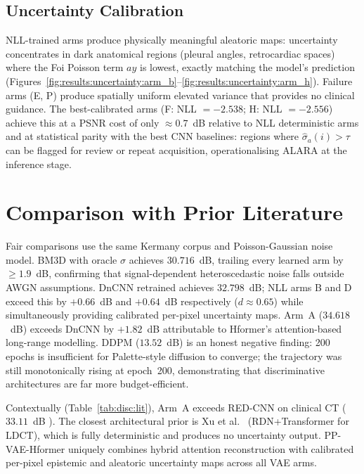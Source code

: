 \documentclass[12pt, a4paper, twoside, openright]{book}
\begin{document}
\subsection{Uncertainty Calibration}
\label{sec:disc:findings:calibration}

NLL-trained arms produce physically meaningful aleatoric maps: uncertainty concentrates in dark anatomical regions (pleural angles, retrocardiac spaces) where the Foi Poisson term $ay$ is lowest, exactly matching the model's prediction (Figures~\ref{fig:results:uncertainty:arm_b}--\ref{fig:results:uncertainty:arm_h}). Failure arms (E, P) produce spatially uniform elevated variance that provides no clinical guidance. The best-calibrated arms (F: NLL $=-2.538$; H: NLL $=-2.556$) achieve this at a PSNR cost of only $\approx 0.7$~dB relative to NLL deterministic arms and at statistical parity with the best CNN baselines: regions where $\hat{\sigma}_a(i)>\tau$ can be flagged for review or repeat acquisition, operationalising ALARA at the inference stage.

\section{Comparison with Prior Literature}
\label{sec:disc:lit}

Fair comparisons use the same Kermany corpus and Poisson-Gaussian noise model. BM3D with oracle $\sigma$ achieves $30.716$~dB, trailing every learned arm by $\geq 1.9$~dB, confirming that signal-dependent heteroscedastic noise falls outside AWGN assumptions. DnCNN retrained achieves $32.798$~dB; NLL arms B and D exceed this by $+0.66$~dB and $+0.64$~dB respectively ($d\approx0.65$) while simultaneously providing calibrated per-pixel uncertainty maps. Arm~A ($34.618$~dB) exceeds DnCNN by $+1.82$~dB attributable to Hformer's attention-based long-range modelling. DDPM ($13.52$~dB) is an honest negative finding: 200 epochs is insufficient for Palette-style diffusion to converge; the trajectory was still monotonically rising at epoch~200, demonstrating that discriminative architectures are far more budget-efficient.

Contextually (Table~\ref{tab:disc:lit}), Arm~A exceeds RED-CNN on clinical CT ($33.11$~dB \cite{chen_low_2017}). The closest architectural prior is Xu et al.\ \cite{xuLowdoseComputedTomography2025} (RDN+Transformer for LDCT), which is fully deterministic and produces no uncertainty output. PP-VAE-Hformer uniquely combines hybrid attention reconstruction with calibrated per-pixel epistemic and aleatoric uncertainty maps across all VAE arms.
\end{document}

